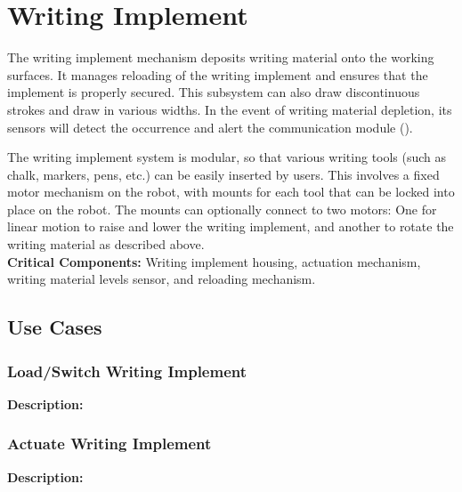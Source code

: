 
\section{Writing Implement}
\label{sec:writing_implement}
The writing implement mechanism deposits writing material onto the working surfaces. It manages reloading of the writing implement and ensures that the implement is properly secured. This subsystem can also draw discontinuous  strokes and draw in various widths. In the event of writing material depletion, its sensors will detect the occurrence and alert the communication module ().

The writing implement system is modular, so that various writing tools (such as chalk, markers, pens, etc.) can be easily inserted by users. This involves a fixed motor mechanism on the robot, with mounts for each tool that can be locked into place on the robot. The mounts can optionally connect to two motors: One for linear motion to raise and lower the writing implement, and another to rotate the writing material as described above. \\

\noindent
\textbf{Critical Components:} Writing implement housing, actuation mechanism, writing material levels sensor, and reloading mechanism.


\subsection{Use Cases}

\subsubsection{Load/Switch Writing Implement}
\textbf{Description:} 

\subsubsection{Actuate Writing Implement}
\textbf{Description:} 

